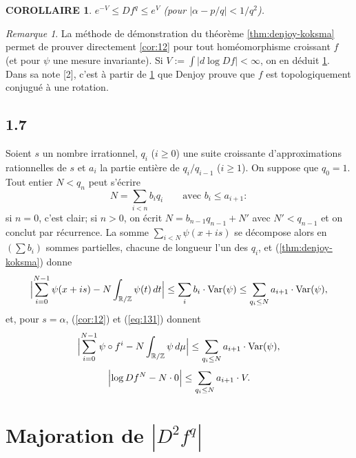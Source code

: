 \documentclass[12pt]{amsart}
\theoremstyle{plain}
\newtheorem{corollaire}[theoreme]{COROLLAIRE}
\theoremstyle{remark}
\newtheorem{remarque}[theoreme]{Remarque}
\DeclareMathOperator*{\Var}{Var}
\begin{document}
\begin{corollaire}\label{cor:15}
$e^{-V} \leq Df^{q} \leq e^{V}$ (pour $|\alpha - p/q| < 1/q^{2}$).
\end{corollaire}

\begin{remarque}\label{rem:16}
La m\'{e}thode de d\'{e}monstration du th\'{e}or\`{e}me \ref{thm:denjoy-koksma} permet de prouver directement \ref{cor:12} pour tout hom\'{e}omorphisme croissant $f$ (et pour $\psi$ une mesure invariante). Si $V := \int |d\log Df| < \infty$, on en d\'{e}duit \ref{cor:15}. Dans sa note [2], c'est \`{a} partir de \ref{cor:15} que Denjoy prouve que $f$ est topologiquement conjugu\'{e} \`{a} une rotation.
\end{remarque}

\subsection*{1.7}
Soient $s$ un nombre irrationnel, $q_{i}$ ($i \geq 0$) une suite croissante d'approximations rationnelles de $s$ et $a_{i}$ la partie enti\`{e}re de $q_{i}/q_{i-1}$ ($i \geq 1$). On suppose que $q_{0} = 1$. Tout entier $N < q_{n}$ peut s'\'{e}crire
\[
N = \sum_{i < n} b_{i} q_{i} \qquad \text{avec } b_{i} \leq a_{i+1} :
\]
si $n = 0$, c'est clair; si $n > 0$, on \'{e}crit $N = b_{n-1}q_{n-1} + N'$ avec $N' < q_{n-1}$ et on conclut par r\'{e}currence. La somme $\sum_{i < N} \psi(x+is)$ se d\'{e}compose alors en $(\sum b_{i})$ sommes partielles, chacune de longueur l'un des $q_{i}$, et (\ref{thm:denjoy-koksma}) donne
\begin{equation}\label{eq:171}
\Bigl|\sum_{i=0}^{N-1} \psi(x+is) - N \int_{\mathbb{R}/\mathbb{Z}} \psi(t)\,dt\Bigr| \leq \sum_{i} b_{i} \cdot \Var(\psi) \leq \sum_{q_{i} \leq N} a_{i+1} \cdot \Var(\psi) ,
\end{equation}
et, pour $s = \alpha$, (\ref{cor:12}) et (\ref{eq:131}) donnent
\begin{equation}\label{eq:172}
\Bigl|\sum_{i=0}^{N-1} \psi \circ f^{i} - N \int_{\mathbb{R}/\mathbb{Z}} \psi\,d\mu\Bigr| \leq \sum_{q_{i} \leq N} a_{i+1} \cdot \Var(\psi) ,
\end{equation}
\begin{equation}\label{eq:173}
\Bigl|\log Df^{N} - N \cdot 0\Bigr| \leq \sum_{q_{i} \leq N} a_{i+1} \cdot V .
\end{equation}

\section{Majoration de $|D^{2}f^{q}|$}
\end{document}
